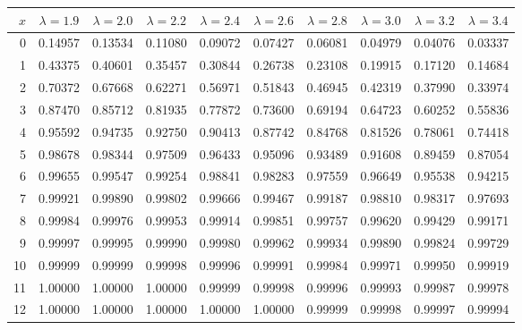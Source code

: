 \myskip
\begin{tabular}{r|*{9}{c}}
$x$ &  $\lambda=1.9$  &  $\lambda=2.0$  &  $\lambda=2.2$  &  $\lambda=2.4$  &  $\lambda=2.6$
    &  $\lambda=2.8$  &  $\lambda=3.0$  &  $\lambda=3.2$  &  $\lambda=3.4$                    \\\hline
  0 & 0.14957 & 0.13534 & 0.11080 & 0.09072 & 0.07427 & 0.06081 & 0.04979 & 0.04076 & 0.03337 \\
  1 & 0.43375 & 0.40601 & 0.35457 & 0.30844 & 0.26738 & 0.23108 & 0.19915 & 0.17120 & 0.14684 \\
  2 & 0.70372 & 0.67668 & 0.62271 & 0.56971 & 0.51843 & 0.46945 & 0.42319 & 0.37990 & 0.33974 \\
  3 & 0.87470 & 0.85712 & 0.81935 & 0.77872 & 0.73600 & 0.69194 & 0.64723 & 0.60252 & 0.55836 \\
  4 & 0.95592 & 0.94735 & 0.92750 & 0.90413 & 0.87742 & 0.84768 & 0.81526 & 0.78061 & 0.74418 \\
  5 & 0.98678 & 0.98344 & 0.97509 & 0.96433 & 0.95096 & 0.93489 & 0.91608 & 0.89459 & 0.87054 \\
  6 & 0.99655 & 0.99547 & 0.99254 & 0.98841 & 0.98283 & 0.97559 & 0.96649 & 0.95538 & 0.94215 \\
  7 & 0.99921 & 0.99890 & 0.99802 & 0.99666 & 0.99467 & 0.99187 & 0.98810 & 0.98317 & 0.97693 \\
  8 & 0.99984 & 0.99976 & 0.99953 & 0.99914 & 0.99851 & 0.99757 & 0.99620 & 0.99429 & 0.99171 \\
  9 & 0.99997 & 0.99995 & 0.99990 & 0.99980 & 0.99962 & 0.99934 & 0.99890 & 0.99824 & 0.99729 \\
 10 & 0.99999 & 0.99999 & 0.99998 & 0.99996 & 0.99991 & 0.99984 & 0.99971 & 0.99950 & 0.99919 \\
 11 & 1.00000 & 1.00000 & 1.00000 & 0.99999 & 0.99998 & 0.99996 & 0.99993 & 0.99987 & 0.99978 \\
 12 & 1.00000 & 1.00000 & 1.00000 & 1.00000 & 1.00000 & 0.99999 & 0.99998 & 0.99997 & 0.99994 \\
\end{tabular}

